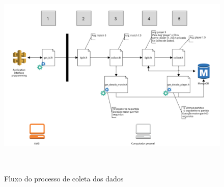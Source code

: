 \documentclass[
12pt,				%
openright,			%
oneside,			%
a4paper,			%
english,			%
brazil,				%
]{abntex2}
\begin{document}
\begin{figure}[H]
  \begin{center}
    \includegraphics[width=14cm,height=10cm]{image/collect.png}
    \caption{Fluxo do processo de coleta dos dados}
  \end{center}
\end{figure}
\end{document}

